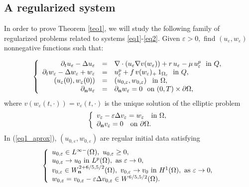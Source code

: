 \documentclass[11pt,reqno]{amsart}%
\numberwithin{equation}{section}
\begin{document}
\subsection{A regularized system}\label{subsec:regularized}
In order to prove Theorem \ref{teo1}, we will study the following family of regularized problems related to systems \eqref{eq1}-\eqref{eq2}.  Given $\varepsilon>0,$ find $({u}_\varepsilon,w_\varepsilon)$ nonnegative functions  such that: {\begin{equation}\label{eq1_aprox}
\left\{
\begin{array}{rcl}
\partial_tu_\varepsilon-\Delta u_\varepsilon
&=&\nabla\cdot(u_\varepsilon\nabla {v(w_\varepsilon}))
 +r\, u_\varepsilon-\mu \, u_\varepsilon^p
\ \  \mbox{in $Q$},\\
\partial_tw_\varepsilon-\Delta w_\varepsilon+w_\varepsilon
&=&u_\varepsilon^p+{f\, v(w_\varepsilon)_+\, 1_{\Omega_c}}\ \  \mbox{in $Q$}, \\
\left(u_\varepsilon(0),w_\varepsilon(0)\right)&=&\left(u_{0,\varepsilon},w_{0,\varepsilon}\right)\ \  \mbox{in $\Omega$},\\
 \partial_{\bf n} u_\varepsilon &=&\partial_{\bf n} w_\varepsilon=0\ \  \mbox{on $(0,T)\times\partial\Omega$},
\end{array}
\right.
\end{equation}
where $v(w_\varepsilon(t,\cdot))= v_\varepsilon(t,\cdot)$  is the unique solution of the elliptic problem
\begin{equation}\label{elip}
\left\{
\begin{array}{lc}
v_\varepsilon-\varepsilon\Delta v_\varepsilon=w_\varepsilon\quad \mbox{in}\ \Omega,\\
\partial_{\bf n}v_\varepsilon=0\quad \mbox{on}\ \partial\Omega.
\end{array}
\right.
\end{equation}
In (\ref{eq1_aprox}), $(u_{0,\varepsilon},w_{0,\varepsilon})$ are regular initial data satisfying 
\begin{equation}\label{elip1}
\left\{
\begin{array}{lc}
u_{0,\varepsilon}\in L^{{\infty}-}(\Omega),\ u_{0,\varepsilon}\ge 0,%
\\
u_{0,\varepsilon}\rightarrow u_0\ \mbox{in}\ L^p(\Omega),\ \mbox{as}\ \varepsilon\rightarrow 0,\\
v_{0,\varepsilon}\in W^{2+6/5,5/2}_{\bf n}(\Omega),\ 
v_{0,\varepsilon}\rightarrow v_0\ \mbox{in}\ H^{1}(\Omega),\ \mbox{as}\ \varepsilon\rightarrow 0,
\\ 
w_{0,\varepsilon}=v_{0,\varepsilon}-\varepsilon\Delta v_{0,\varepsilon}\in {W}^{6/5,5/2}(\Omega).
\end{array}
\right.
\end{equation}

}
\end{document}
